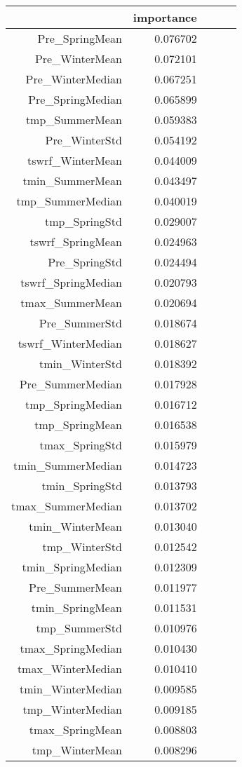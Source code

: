 \begin{tabular}{rrrrr}
\toprule
 & importance \\
\midrule
Pre_SpringMean & 0.076702 \\
Pre_WinterMean & 0.072101 \\
Pre_WinterMedian & 0.067251 \\
Pre_SpringMedian & 0.065899 \\
tmp_SummerMean & 0.059383 \\
Pre_WinterStd & 0.054192 \\
tswrf_WinterMean & 0.044009 \\
tmin_SummerMean & 0.043497 \\
tmp_SummerMedian & 0.040019 \\
tmp_SpringStd & 0.029007 \\
tswrf_SpringMean & 0.024963 \\
Pre_SpringStd & 0.024494 \\
tswrf_SpringMedian & 0.020793 \\
tmax_SummerMean & 0.020694 \\
Pre_SummerStd & 0.018674 \\
tswrf_WinterMedian & 0.018627 \\
tmin_WinterStd & 0.018392 \\
Pre_SummerMedian & 0.017928 \\
tmp_SpringMedian & 0.016712 \\
tmp_SpringMean & 0.016538 \\
tmax_SpringStd & 0.015979 \\
tmin_SummerMedian & 0.014723 \\
tmin_SpringStd & 0.013793 \\
tmax_SummerMedian & 0.013702 \\
tmin_WinterMean & 0.013040 \\
tmp_WinterStd & 0.012542 \\
tmin_SpringMedian & 0.012309 \\
Pre_SummerMean & 0.011977 \\
tmin_SpringMean & 0.011531 \\
tmp_SummerStd & 0.010976 \\
tmax_SpringMedian & 0.010430 \\
tmax_WinterMedian & 0.010410 \\
tmin_WinterMedian & 0.009585 \\
tmp_WinterMedian & 0.009185 \\
tmax_SpringMean & 0.008803 \\
tmp_WinterMean & 0.008296 \\

\end{tabular}
